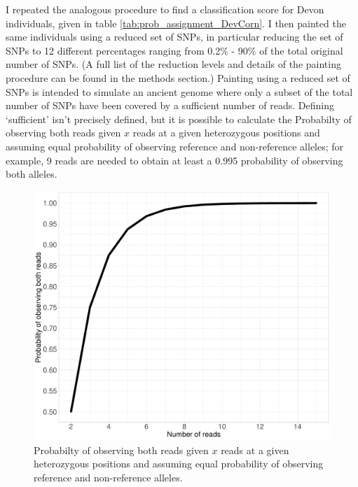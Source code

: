 I repeated the analogous procedure to find a classification score for Devon individuals, given in table \ref{tab:prob_assignment_DevCorn}. I then painted the same individuals using a reduced set of SNPs, in particular reducing the set of SNPs to 12 different percentages ranging from 0.2\% - 90\% of the total original number of SNPs. (A full list of the reduction levels and details of the painting procedure can be found in the methods section.) Painting using a reduced set of SNPs is intended to simulate an ancient genome where only a subset of the total number of SNPs have been covered by a sufficient number of reads. Defining `sufficient' isn't precisely defined, but it is possible to calculate the   Probabilty of observing both reads given $x$ reads at a given heterozygous positions and assuming equal probability of observing reference and non-reference alleles; for example, 9 reads are needed to obtain at least a 0.995 probability of observing both alleles. 

\begin{figure}[htp]
    \centering
    \includegraphics[width=1.0\textwidth]{../images/chapter1/het_prob.pdf}
    \caption{Probabilty of observing both reads given $x$ reads at a given heterozygous positions and assuming equal probability of observing reference and non-reference alleles.}
    \label{fig:uncertainty_v_noUncertainty_0.5x_0.1x}
\end{figure}


